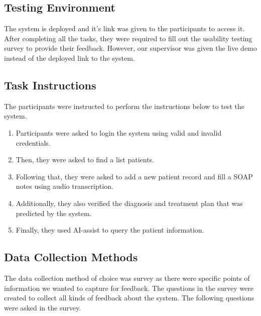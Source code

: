 \documentclass{article}
\begin{document}
\subsection{Testing Environment}

The system is deployed and it's link was given to the participants to access it. After completing all the tasks, they were required to fill out the usability testing survey to provide their feedback. However, our supervisor was given the live demo instead of the deployed link to the system.

\subsection{Task Instructions}

The participants were instructed to perform the instructions below to test the system.

\begin{enumerate}
    \item Participants were asked to login the system using valid and invalid credentials.
    \item Then, they were asked to find a list patients.
    \item Following that, they were asked to add a new patient record and fill a SOAP notes using audio transcription.
    \item Additionally, they also verified the diagnosis and treatment plan that was predicted by the system.
    \item Finally, they used AI-assist to query the patient information.
\end{enumerate}

\subsection{Data Collection Methods}

The data collection method of choice was survey as there were specific points of information we wanted to capture for feedback. The questions in the survey were created to collect all kinds of feedback about the system. The following questions were asked in the survey.
\end{document}
